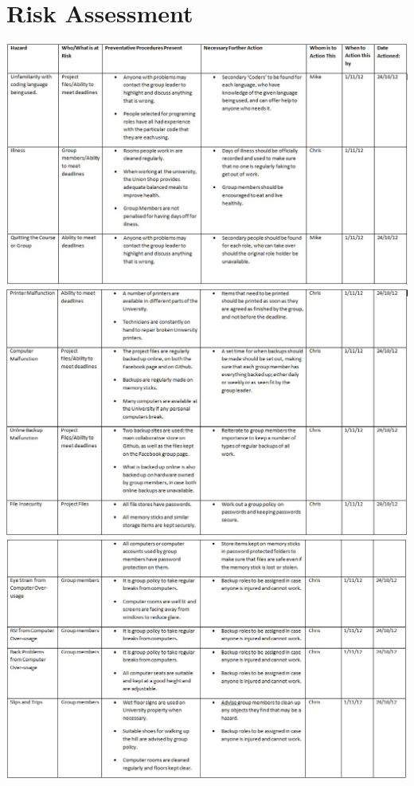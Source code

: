\documentclass{project}
\begin{document}
\section{Risk Assessment}
\includegraphics[scale=0.6]{risk1.jpg}\\
\includegraphics[scale=0.6]{risk2.jpg}\\
\includegraphics[scale=0.6]{risk3.jpg}\\
\end{document}
